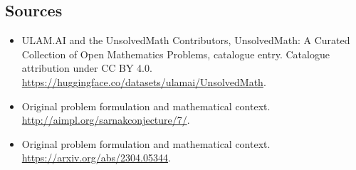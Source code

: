 \documentclass[11pt]{article}
\begin{document}
\subsection{Sources}
\begin{itemize}
\item[\hypertarget{source:statement:1}{S1}] ULAM.AI and the UnsolvedMath Contributors, UnsolvedMath: A Curated Collection of Open Mathematics Problems, catalogue entry. Catalogue attribution under CC BY 4.0.
\url{https://huggingface.co/datasets/ulamai/UnsolvedMath}.
\item[\hypertarget{source:statement:2}{S2}] Original problem formulation and mathematical context.
\url{http://aimpl.org/sarnakconjecture/7/}.
\item[\hypertarget{source:statement:3}{S3}] Original problem formulation and mathematical context.
\url{https://arxiv.org/abs/2304.05344}.
\end{itemize}
\label{end:statement}
\end{document}
